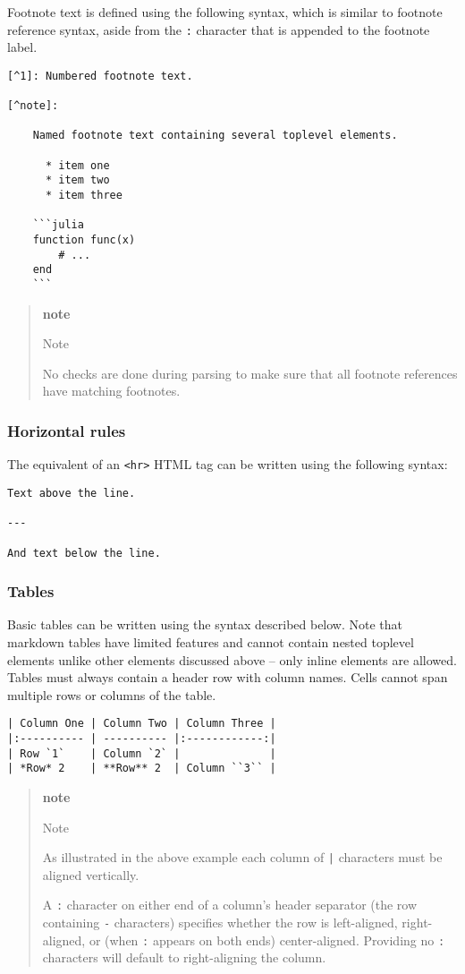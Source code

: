 Footnote text is defined using the following syntax, which is similar to footnote reference syntax, aside from the \texttt{:} character that is appended to the footnote label.

\begin{verbatim}
[^1]: Numbered footnote text.

[^note]:

    Named footnote text containing several toplevel elements.

      * item one
      * item two
      * item three

    ```julia
    function func(x)
        # ...
    end
    ```
\end{verbatim}
\begin{quote}
\textbf{note}

Note

No checks are done during parsing to make sure that all footnote references have matching footnotes.

\end{quote}
\subsubsection{Horizontal rules}
The equivalent of an \texttt{<hr>} HTML tag can be written using the following syntax:

\begin{verbatim}
Text above the line.

---

And text below the line.
\end{verbatim}
\subsubsection{Tables}
Basic tables can be written using the syntax described below. Note that markdown tables have limited features and cannot contain nested toplevel elements unlike other elements discussed above – only inline elements are allowed. Tables must always contain a header row with column names. Cells cannot span multiple rows or columns of the table.

\begin{verbatim}
| Column One | Column Two | Column Three |
|:---------- | ---------- |:------------:|
| Row `1`    | Column `2` |              |
| *Row* 2    | **Row** 2  | Column ``3`` |
\end{verbatim}
\begin{quote}
\textbf{note}

Note

As illustrated in the above example each column of \texttt{|} characters must be aligned vertically.

A \texttt{:} character on either end of a column's header separator (the row containing \texttt{-} characters) specifies whether the row is left-aligned, right-aligned, or (when \texttt{:} appears on both ends) center-aligned. Providing no \texttt{:} characters will default to right-aligning the column.

\end{quote}
